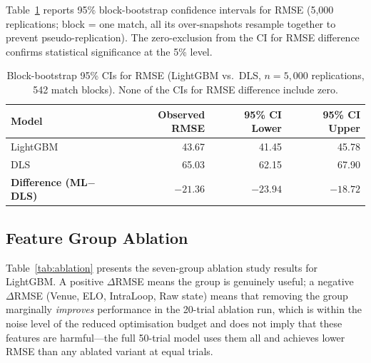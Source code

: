 \documentclass[12pt,a4paper,oneside]{report}
\begin{document}
Table~\ref{tab:bootstrap} reports 95\% block-bootstrap confidence intervals for RMSE (5{,}000 replications; block = one match, all its over-snapshots resample together to prevent pseudo-replication).  The zero-exclusion from the CI for RMSE difference confirms statistical significance at the 5\% level.

\begin{table}[htbp]
\centering
\caption[Block-bootstrap 95\% confidence intervals for RMSE]{Block-bootstrap 95\% CIs for RMSE (LightGBM vs.\ DLS, $n=5{,}000$ replications, 542 match blocks).  None of the CIs for RMSE difference include zero.}
\label{tab:bootstrap}
\small
\begin{tabular}{lrrr}
\toprule
\textbf{Model} & \textbf{Observed RMSE} & \textbf{95\% CI Lower} & \textbf{95\% CI Upper} \\
\midrule
LightGBM & 43.67 & 41.45 & 45.78 \\
DLS         & 65.03 & 62.15 & 67.90 \\
\midrule
\textbf{Difference (ML$-$DLS)} & $-21.36$ & $-23.94$ & $-18.72$ \\
\bottomrule
\end{tabular}
\end{table}

\subsection{Feature Group Ablation}

Table~\ref{tab:ablation} presents the seven-group ablation study results for LightGBM.  A positive $\Delta$RMSE means the group is genuinely useful; a negative $\Delta$RMSE (Venue, ELO, IntraLoop, Raw state) means that removing the group marginally \emph{improves} performance in the 20-trial ablation run, which is within the noise level of the reduced optimisation budget and does not imply that these features are harmful---the full 50-trial model uses them all and achieves lower RMSE than any ablated variant at equal trials.
\end{document}
